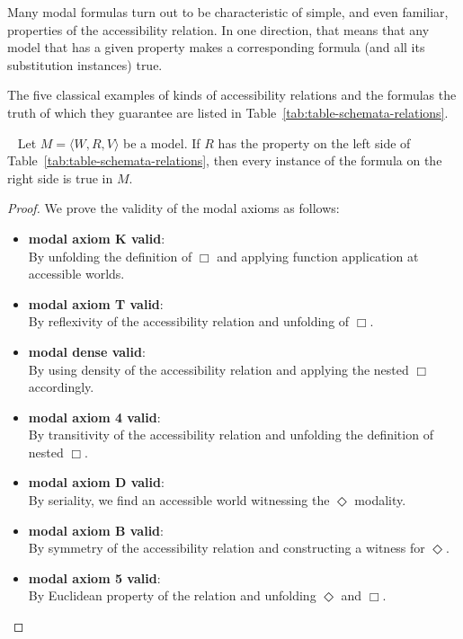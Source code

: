 Many modal formulas turn out to be characteristic of simple, and
even familiar, properties of the accessibility relation. In one direction, 
that means that any model that has a given property makes a 
corresponding formula (and all its substitution instances) true. 

The five classical examples of kinds of accessibility 
relations and the formulas the truth of which they guarantee are 
listed in Table~\ref{tab:table-schemata-relations}.

\begin{theorem}
  \label{thm:truth-guarantee}
  \
  \leanok
  Let $M = \langle W, R, V \rangle$ be a model. If $R$ has the property 
  on the left side of Table~\ref{tab:table-schemata-relations}, then every instance of the formula on the 
  right side is true in $M$.
\end{theorem}
\begin{proof}\label{proof:truth-guarantee}
  We prove the validity of the modal axioms as follows:
  \begin{itemize}
    \item \textbf{modal axiom K valid}:  \\
    By unfolding the definition of \(\Box\) and applying function application at accessible worlds.

    \item \textbf{modal axiom T valid}: \\
    By reflexivity of the accessibility relation and unfolding of \(\Box\).

    \item \textbf{modal dense valid}: \\
    By using density of the accessibility relation and applying the nested \(\Box\) accordingly.

    \item \textbf{modal axiom 4 valid}: \\
    By transitivity of the accessibility relation and unfolding the definition of nested \(\Box.\)

    \item \textbf{modal axiom D valid}:  \\
    By seriality, we find an accessible world witnessing the \(\Diamond\) modality.

    \item \textbf{modal axiom B valid}:  \\
    By symmetry of the accessibility relation and constructing a witness for \(\Diamond\).

    \item \textbf{modal axiom 5 valid}: \\
    By Euclidean property of the relation and unfolding \(\Diamond\) and \(\Box\).
  \end{itemize}
\end{proof}

